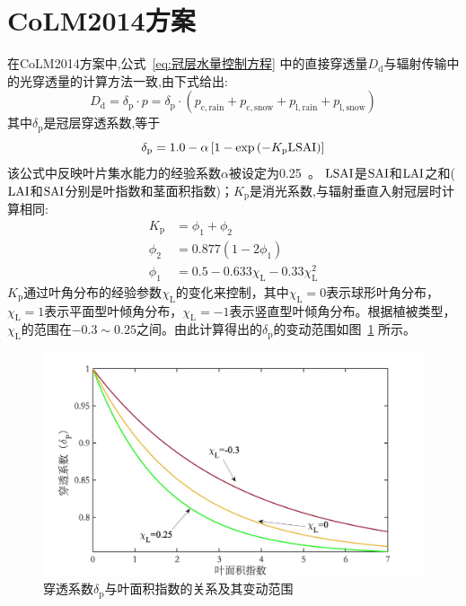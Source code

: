 \section{CoLM2014方案}
在CoLM2014方案中,公式~\eqref{eq:冠层水量控制方程} 中的直接穿透量$D_{\mathrm {d}} $与辐射传输中的光穿透量的计算方法一致,由下式给出:
\begin{equation}
  D_{\mathrm{d}}=\delta_{\mathrm{p}} \cdot p=\delta_{\mathrm{p}} \cdot\left(p_{\mathrm{c,rain}}+p_{\mathrm{c,snow}}+p_{\mathrm{l,rain}}+p_{\mathrm{l,snow}}\right)
\end{equation}
其中$\delta_{\mathrm {p}} $是冠层穿透系数,等于
\begin{equation}
  \delta_{\mathrm{p}}=1.0-\alpha \left[1-\exp \left(-K_{\mathrm{p}}  {\rm LSAI}\right)\right]
\end{equation}
该公式中反映叶片集水能力的经验系数$\alpha$被设定为0.25~\citep{lawrence2011parameterization}。
${\rm LSAI}$是${\rm SAI}$和${\rm LAI}$之和(${\rm LAI}$和${\rm SAI}$分别是叶指数和茎面积指数)；$K_{\mathrm {p}} $是消光系数,与辐射垂直入射冠层时计算相同:
\begin{equation}\label{eq:消光系数}
  \begin{aligned}
    K_{\mathrm{p}} &= \phi_{1}+\phi_{2} \\
    \phi_{2} &= 0.877\left(1-2 \phi_{1}\right) \\
    \phi_{1} &= 0.5-0.633 \chi_{\mathrm{L}}-0.33 \chi_{\mathrm{L}}^{2}
  \end{aligned}
\end{equation}
$K_{\mathrm {p}} $通过叶角分布的经验参数$\chi_{\mathrm {L}} $的变化来控制，其中$\chi_{\mathrm {L}} =0$表示球形叶角分布，$\chi_{\mathrm {L}} = 1$表示平面型叶倾角分布，$\chi_{\mathrm {L}} = -1$表示竖直型叶倾角分布。根据植被类型，$\chi_{\mathrm {L}} $的范围在$-0.3\sim0.25$之间。由此计算得出的$\delta_{\mathrm {p}} $的变动范围如图~\ref{fig:穿透系数与叶面积指数} 所示。
{
  \begin{figure}[htbp]
    \centering
    \includegraphics[width=1.0\textwidth]{Figures/陆地表面的水分循环/穿透系数与叶面积指数.jpg}
    \caption{穿透系数$\delta_{\mathrm {p}} $与叶面积指数的关系及其变动范围}
    \label{fig:穿透系数与叶面积指数}
  \end{figure}
}

